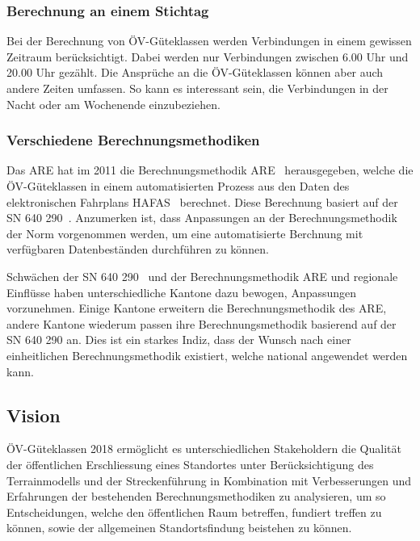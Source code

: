 \subsubsection{Berechnung an einem Stichtag}
\label{Problemstellung:Berechnung an einem Stichtag}

Bei der Berechnung von \acs{ÖV}-Güteklassen werden Verbindungen in einem gewissen Zeitraum berücksichtigt.
Dabei werden nur Verbindungen zwischen 6.00 Uhr und 20.00 Uhr gezählt.
Die Ansprüche an die \acs{ÖV}-Güteklassen können aber auch andere Zeiten umfassen.
So kann es interessant sein, die Verbindungen in der Nacht oder am Wochenende einzubeziehen.

\subsubsection{Verschiedene Berechnungsmethodiken}
\label{Problemstellung:Verschiedene Berechnungsmethodiken}

Das \ac{ARE} hat im 2011 die Berechnungsmethodik \acs{ARE}~\cite{berechnung_are} herausgegeben, welche die \acs{ÖV}-Güteklassen in einem automatisierten Prozess aus den Daten des elektronischen Fahrplans HAFAS~\cite{sbb_hafas_spec} berechnet.
Diese Berechnung basiert auf der \acs{SN} 640 290~\cite{sn640290}.
Anzumerken ist, dass Anpassungen an der Berechnungsmethodik der Norm vorgenommen werden, um eine automatisierte Berchnung mit verfügbaren Datenbeständen durchführen zu können.

Schwächen der \acs{SN} 640 290~\cite{sn640290} und der Berechnungsmethodik \acs{ARE} und regionale Einflüsse haben unterschiedliche Kantone dazu bewogen, Anpassungen vorzunehmen.
Einige Kantone erweitern die Berechnungsmethodik des \acs{ARE}, andere Kantone wiederum passen ihre Berechnungsmethodik basierend auf der \acs{SN} 640 290 an.
Dies ist ein starkes Indiz, dass der Wunsch nach einer einheitlichen Berechnungsmethodik existiert, welche national angewendet werden kann.

\subsection{Vision}
\label{Einführung:Vision}

\acs{ÖV}-Güteklassen 2018 ermöglicht es unterschiedlichen Stakeholdern die Qualität der öffentlichen Erschliessung eines Standortes unter Berücksichtigung des \gls{Terrainmodell}s und der Streckenführung in Kombination mit Verbesserungen und Erfahrungen der bestehenden Berechnungsmethodiken zu analysieren, um so Entscheidungen, welche den öffentlichen Raum betreffen, fundiert treffen zu können, sowie der allgemeinen Standortsfindung beistehen zu können.

